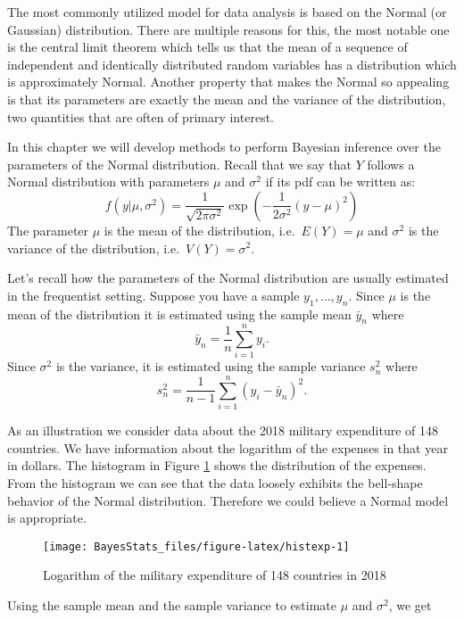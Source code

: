 \documentclass[
]{book}
\begin{document}
The most commonly utilized model for data analysis is based on the Normal (or Gaussian) distribution. There are multiple reasons for this, the most notable one is the central limit theorem which tells us that the mean of a sequence of independent and identically distributed random variables has a distribution which is approximately Normal. Another property that makes the Normal so appealing is that its parameters are exactly the mean and the variance of the distribution, two quantities that are often of primary interest.

In this chapter we will develop methods to perform Bayesian inference over the parameters of the Normal distribution. Recall that we say that \(Y\) follows a Normal distribution with parameters \(\mu\) and \(\sigma^2\) if its pdf can be written as:
\[
f(y|\mu,\sigma^2)=\frac{1}{\sqrt{2\pi\sigma^2}}\exp\left(-\frac{1}{2\sigma^2}(y-\mu)^2\right)
\]
The parameter \(\mu\) is the mean of the distribution, i.e.~\(E(Y)=\mu\) and \(\sigma^2\) is the variance of the distribution, i.e.~\(V(Y)=\sigma^2\).

Let's recall how the parameters of the Normal distribution are usually estimated in the frequentist setting. Suppose you have a sample \(y_1,\dots,y_n\). Since \(\mu\) is the mean of the distribution it is estimated using the sample mean \(\bar{y}_n\) where
\[
\bar{y}_n=\frac{1}{n}\sum_{i=1}^ny_i.
\]
Since \(\sigma^2\) is the variance, it is estimated using the sample variance \(s^2_n\) where
\[
s^2_n=\frac{1}{n-1}\sum_{i=1}^n(y_i-\bar{y}_n)^2.
\]

As an illustration we consider data about the 2018 military expenditure of 148 countries. We have information about the logarithm of the expenses in that year in dollars. The histogram in Figure \ref{fig:histexp} shows the distribution of the expenses. From the histogram we can see that the data loosely exhibits the bell-shape behavior of the Normal distribution. Therefore we could believe a Normal model is appropriate.

\begin{figure}

{\centering \texttt{[image: BayesStats\_files/figure-latex/histexp-1]} 

}

\caption{Logarithm of the military expenditure of 148 countries in 2018}\label{fig:histexp}
\end{figure}

Using the sample mean and the sample variance to estimate \(\mu\) and \(\sigma^2\), we get
\end{document}
